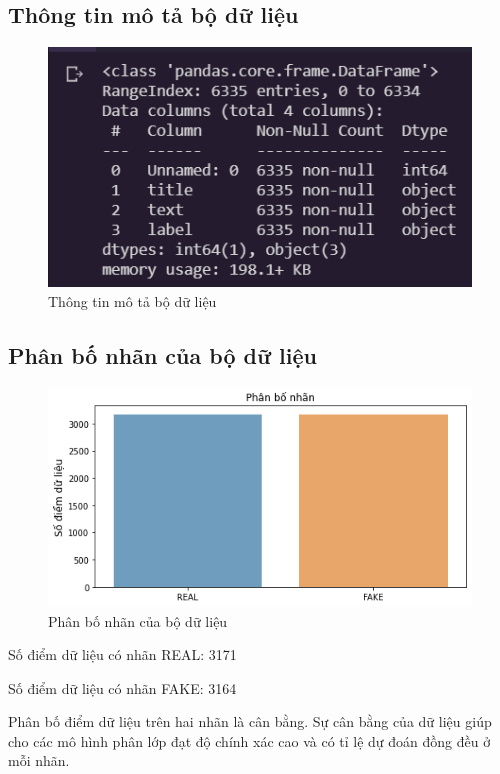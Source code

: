 \documentclass[12pt,a4paper,oneside]{book}
\begin{document}
	\subsection{Thông tin mô tả bộ dữ liệu}
				\begin{figure}[H]
					\begin{center}
						\includegraphics[width=0.78\columnwidth]{dfinfo}
					\end{center}
					\caption{Thông tin mô tả bộ dữ liệu}
				\end{figure}
	\subsection{Phân bố nhãn của bộ dữ liệu}
			\begin{figure}[H]
				\begin{center}
					\includegraphics[width=0.8\columnwidth]{phanbonhan}
				\end{center}
				\caption{Phân bố nhãn của bộ dữ liệu}
			\end{figure}
			
	Số điểm dữ liệu có nhãn REAL: 3171
	
	Số điểm dữ liệu có nhãn FAKE: 3164
	
	Phân bố điểm dữ liệu trên hai nhãn là cân bằng. Sự cân bằng của dữ liệu giúp cho các mô hình phân lớp đạt độ chính xác cao và có tỉ lệ dự đoán đồng đều ở mỗi nhãn.
\end{document}

